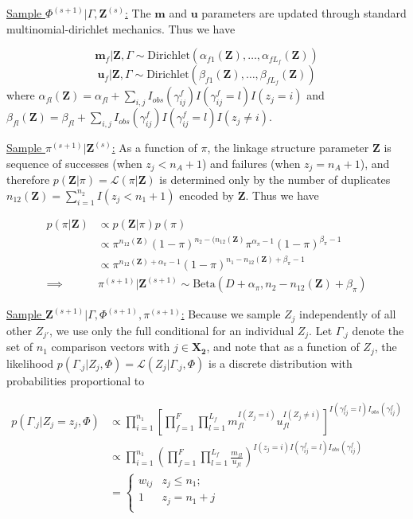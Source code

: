 \documentclass[12pt,letterpaper]{article}
\newcommand{\1}[1]{\mathbb{I}\!\left[#1\right]} %
\begin{document}
{\underline{Sample $\Phi^{(s+1)}|\Gamma, \mathbf{Z}^{(s)}$:}
The \(\mathbf{m}\) and \(\mathbf{u}\) parameters are updated through
standard multinomial-dirichlet mechanics. Thus we have

\[\mathbf{m}_f|\mathbf{Z}, \Gamma \sim \text{Dirichlet}(\alpha_{f1}(\mathbf{Z}), \ldots, \alpha_{fL_f}(\mathbf{Z}))\]
\[\mathbf{u}_f|\mathbf{Z}, \Gamma \sim \text{Dirichlet}(\beta_{f1}(\mathbf{Z}), \ldots, \beta_{fL_f}(\mathbf{Z}))\]
where
\(\alpha_{fl}(\mathbf{Z})= \alpha_{fl} + \sum_{i,j} I_{obs}(\gamma_{ij}^f)I(\gamma_{ij}^f = l) I(z_j = i)\)
and
\(\beta_{fl}(\mathbf{Z})= \beta_{fl} + \sum_{i,j} I_{obs}(\gamma_{ij}^f)I(\gamma_{ij}^f = l) I(z_j \neq i)\).

\underline{Sample $\pi^{(s+1)}|\mathbf{Z}^{(s)}$:} As a function of
\(\pi\), the linkage structure parameter \(\mathbf{Z}\) is sequence
of successes (when \(z_j < n_A + 1\)) and failures (when
\(z_j = n_A + 1\)), and therefore
\(p(\mathbf{Z}|\pi) = \mathcal{L}(\pi|\mathbf{Z})\) is
determined only by the number of duplicates
$n_{12}(\mathbf{Z}) = \sum_{i=1}^{n_2}I(z_j < n_1 + 1)$ encoded by
$\mathbf{Z}$. Thus we have

\begin{align*}
p(\pi | \mathbf{Z}) &\propto p(\mathbf{Z}|\pi)p(\pi) \\
&\propto \pi^{n_{12}(\mathbf{Z})} (1-\pi)^{n_2 - (n_{12}(\mathbf{Z})} \pi^{\alpha_{\pi} -1} (1-\pi)^{\beta_{\pi} -1} \\
&\propto \pi^{n_{12}(\mathbf{Z}) + \alpha_{\pi} - 1} (1-\pi)^{n_1 - n_{12}(\mathbf{Z}) + \beta_{\pi} -1} \\
\implies &\pi^{(s+1)}|\mathbf{Z}^{(s+1)} \sim \text{Beta}(D + \alpha_{\pi}, n_2 - n_{12}(\mathbf{Z}) + \beta_{\pi})
\end{align*}

\underline{Sample $\mathbf{Z}^{(s+1)}|\Gamma, \Phi^{(s+1)}, \pi^{(s+1)}$:}
Because we sample \(Z_j\) independently of all other \(Z_{j'}\), we use
only the full conditional for an individual \(Z_j\). Let \(\Gamma_{.j}\)
denote the set of \(n_1\) comparison vectors with \(j \in \bm{X_2}\), and note that as a function of \(Z_j\), the likelihood
\(p(\Gamma_{.j}|Z_j, \Phi) = \mathcal{L}(Z_j|\Gamma_{.j}, \Phi)\)
is a discrete distribution with probabilities proportional to

\begin{align*}
	p(\Gamma_{.j}|Z_j = z_j, \Phi) &\propto \prod_{i=1}^{n_1}\left[\prod_{f=1}^{F}\prod_{l=1}^{L_f} m_{fl}^{I(Z_j = i)}u_{fl}^{I(Z_j \neq i)}\right]^{I(\gamma_{ij}^f = l)I_{obs}(\gamma_{ij}^f)}\\
	&\propto \prod_{i=1}^{n_1}\left(\prod_{f=1}^{F}\prod_{l=1}^{L_f} \frac{m_{fl}}{u_{fl}}\right)^{I(z_j = i) I(\gamma_{ij}^f = l)I_{obs}(\gamma_{ij}^f)} \\
	&=
	\begin{cases} 
		w_{ij}  & z_j \leq n_1; \\
		1 &  z_j  = n_1 + j \\
	\end{cases}\\
\end{align*}

}
\end{document}
